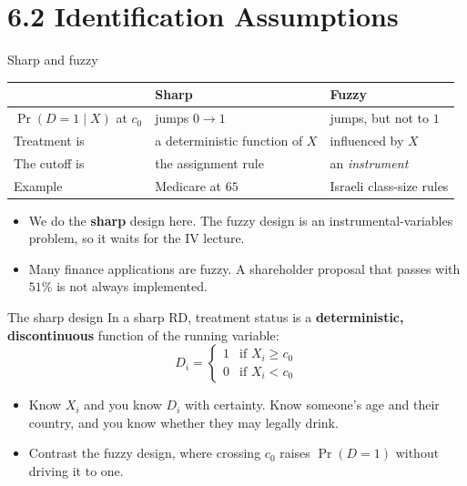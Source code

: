\documentclass[
  11pt,
  ignorenonframetext,
  aspectratio=169,
]{beamer}
\providecommand{\tightlist}{%
  \setlength{\itemsep}{0pt}\setlength{\parskip}{0pt}}
\begin{document}
\section{6.2 Identification
Assumptions}\label{identification-assumptions}

\begin{frame}{Sharp and fuzzy}
\protect{}\label{sharp-and-fuzzy}
\begin{center}
\small
\begin{tabular}{lll}
\toprule
 & Sharp & Fuzzy \\
\midrule
$\Pr(D = 1 \mid X)$ at $c_0$ & jumps $0 \to 1$ & jumps, but not to $1$ \\
Treatment is       & a deterministic function of $X$ & influenced by $X$ \\
The cutoff is      & the assignment rule & an \emph{instrument} \\
Example            & Medicare at $65$ & Israeli class-size rules \\
\bottomrule
\end{tabular}
\end{center}

\begin{itemize}
\tightlist
\item
  We do the \textbf{sharp} design here. The fuzzy design is an
  instrumental-variables problem, so it waits for the IV lecture.
\item
  Many finance applications are fuzzy. A shareholder proposal that
  passes with \(51\%\) is not always implemented.
\end{itemize}
\end{frame}

\begin{frame}{The sharp design}
\protect{}\label{the-sharp-design}
In a sharp RD, treatment status is a \textbf{deterministic,
discontinuous} function of the running variable: \[
D_i = \begin{cases} 1 & \text{if } X_i \geq c_0 \\ 0 & \text{if } X_i < c_0 \end{cases}
\]

\begin{itemize}
\tightlist
\item
  Know \(X_i\) and you know \(D_i\) with certainty. Know someone's age
  and their country, and you know whether they may legally drink.
\item
  Contrast the fuzzy design, where crossing \(c_0\) raises \(\Pr(D=1)\)
  without driving it to one.
\end{itemize}
\end{frame}
\end{document}
